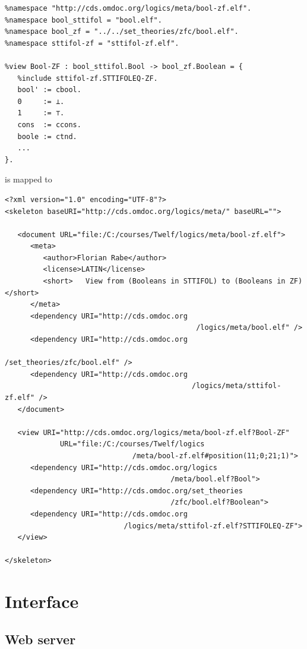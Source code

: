 \begin{enumerate}
\begin{verbatim}
%namespace "http://cds.omdoc.org/logics/meta/bool-zf.elf".
%namespace bool_sttifol = "bool.elf".
%namespace bool_zf = "../../set_theories/zfc/bool.elf".
%namespace sttifol-zf = "sttifol-zf.elf".

%view Bool-ZF : bool_sttifol.Bool -> bool_zf.Boolean = {
   %include sttifol-zf.STTIFOLEQ-ZF.
   bool' := cbool.
   0     := ⊥.
   1     := ⊤.
   cons  := ccons.
   boole := ctnd.
   ...
}.
\end{verbatim}
is mapped to
\begin{verbatim}
<?xml version="1.0" encoding="UTF-8"?>
<skeleton baseURI="http://cds.omdoc.org/logics/meta/" baseURL="">

   <document URL="file:/C:/courses/Twelf/logics/meta/bool-zf.elf">
      <meta>
         <author>Florian Rabe</author>
         <license>LATIN</license>
         <short>   View from (Booleans in STTIFOL) to (Booleans in ZF)</short>
      </meta>
      <dependency URI="http://cds.omdoc.org
                                             /logics/meta/bool.elf" />
      <dependency URI="http://cds.omdoc.org
                                            /set_theories/zfc/bool.elf" />
      <dependency URI="http://cds.omdoc.org
                                            /logics/meta/sttifol-zf.elf" />
   </document>

   <view URI="http://cds.omdoc.org/logics/meta/bool-zf.elf?Bool-ZF"
             URL="file:/C:/courses/Twelf/logics
                              /meta/bool-zf.elf#position(11;0;21;1)">
      <dependency URI="http://cds.omdoc.org/logics
                                       /meta/bool.elf?Bool">
      <dependency URI="http://cds.omdoc.org/set_theories
                                       /zfc/bool.elf?Boolean">
      <dependency URI="http://cds.omdoc.org
                            /logics/meta/sttifol-zf.elf?STTIFOLEQ-ZF">
   </view>

</skeleton>
\end{verbatim}
\end{enumerate}



\section{Interface}\label{sec:interface}

\subsection{Web server}

